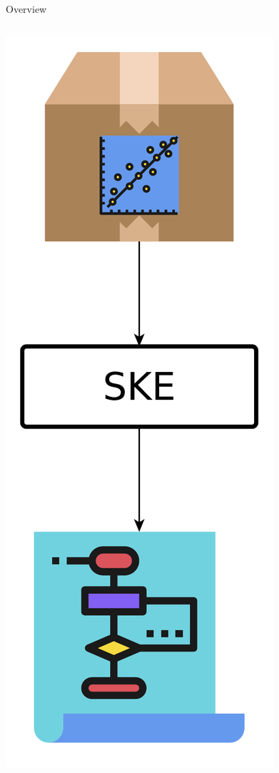 \documentclass[presentation]{beamer}\mode<presentation>{\usetheme{AMSBolognaFC}}
\begin{document}
\begin{frame}[allowframebreaks]{Overview}
    \begin{columns}
        \begin{column}{0.19\linewidth}
            \includegraphics[width=\linewidth]{figures/ske.pdf}

\end{column}
\end{columns}
\end{frame}
\end{document}
